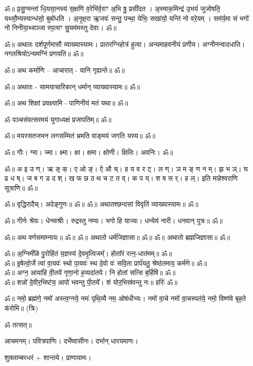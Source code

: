 ॐ॥ प्र॒सु॒ग्मन्ता॑ धि॒यसा॒नस्य॑ स॒क्षणि॑ व॒रेभि॑र्व॒राꣳ अ॒भि षु॒ प्रसी॑दत । अ॒स्माक॒मिन्द्र॑ उ॒भयं॑
जुजोषति॒ यथ्सौ॒म्यस्यान्ध॑सो॒ बुबो॑धति । अ॒नृ॒क्ष॒रा ऋ॒जवः॑ सन्तु॒ पन्था॒ येभिः॒ सखा॑यो॒ यन्ति॑ नो
वरे॒यम् । सम॑र्य॒मा सं भगो॑ नो निनीया॒थ्सञ्जास्प॒त्यꣳ सु॒यम॑मस्तु देवाः। ॐ॥

ॐ॥ अथातः दर्शपूर्णमासौ व्याख्यास्यामः। प्रातरग्निहोत्रं हुत्वा। अन्यमाहवनीयं प्रणीय।
अग्नीनन्वादधाति। नगतश्रियोऽन्यमग्निं प्रणयति॥ ॐ॥ 

ॐ॥ अथ कर्माणि -- आचारात् - यानि गृह्यन्ते॥ ॐ॥  

ॐ॥  अथातः - सामयाचारिकान् धर्मान् व्याख्यास्यामः॥ ॐ॥

ॐ॥ अथ शिक्षां प्रवक्ष्यामि - पाणिनीयं मतं यथा॥ ॐ॥

ॐ पञ्चसंवत्सरमयं युगाध्यक्षं प्रजापतिम्॥ ॐ॥

ॐ॥ मयरसतजभन लगसम्मितं भ्रमति वाङ्मयं जगति यस्य॥ ॐ॥

ॐ॥ गौः। ग्मा। ज्मा। क्ष्मा। क्षा। क्षमा। क्षोणी। क्षितिः। अवनिः। ॐ॥

ॐ॥ अ इ उ ण्। ऋ ऌ क्। ए ओ ङ्। ऐ औ च्। ह य व र ट्। ल ण्। ञ म ङ् ण न म्।
झ भ ञ्। घ ढ ध ष्। ज ब ग ड द श्। ख फ छ ठ थ च ट त व्।
क प य्। श ष स र्। ह ल्। इति माहेश्वराणि सूत्राणि॥ ॐ॥

ॐ॥ वृद्धिरादैच्। अदेङ्गुणः॥ ॐ॥  
ॐ॥ अथातश्छन्दसां विवृतिं व्याख्यास्यामः॥ ॐ॥ 

ॐ॥ गीर्नः श्रेयः। धेनवश्रीः। रुद्रस्तु नम्यः। भगो हि याज्यः।
धन्येयं नारी। धनवान् पुत्रः॥ ॐ॥

ॐ॥ अथ वर्णसमाम्नायः॥ ॐ॥
ॐ॥ अथातो धर्मजिज्ञासा॥ ॐ॥
ॐ॥ अथातो ब्रह्मजिज्ञासा॥ ॐ॥

ॐ॥ अ॒ग्निमी᳚ळे पु॒रोहि॑तं य॒ज्ञस्य॑ दे॒वमृ॒त्विजम्᳚। होता᳚रं रत्न॒-धात॑मम्॥ ॐ॥\\
ॐ॥ इ॒षेत्वो॒र्जे त्वा॑ वा॒यवः॑ स्थो पा॒यवः॑ स्थ दे॒वो वः॑ सवि॒ता प्रार्प॑यतु॒ श्रेष्ठ॑तमाय॒ कर्म॑णे॥ ॐ॥\\
ॐ॥ अग्न॒ आया॑हि वी॒तये॑ गृणा॒नो ह॒व्यदा॑तये। नि होता॑ सत्सि ब॒र्हिषि॑॥ ॐ॥\\
ॐ॥ शन्नो॑ दे॒वीर॒भिष्ट॑य॒ आपो॑ भवन्तु पी॒तये᳚। शं योर॒भिस्र॑वन्तु नः॥ हरिः॑ ॐ॥

ॐ॥ नमो॒ ब्रह्म॑णे॒ नमो॑ अस्त्व॒ग्नये॒ नमः॑ पृथि॒व्यै नम॒ ओष॑धीभ्यः।
नमो॑ वा॒चे नमो॑ वा॒चस्पत॑ये॒ नमो॒ विष्ण॑वे बृह॒ते क॑रोमि॥ (त्रिः)

ॐ तत्सत्॥


आचमनम्। पवित्रपाणिः। दर्भेष्वासीनः। दर्भान् धारयमाणः।

शुक्लाम्बरधरं + शान्तये। प्राणायामः।

